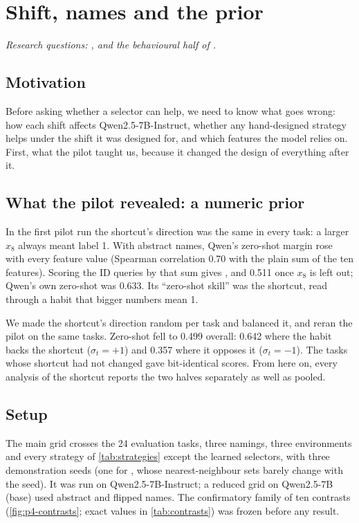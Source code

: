 \chapter{Shift, names and the prior}
\label{ch:shift}

\emph{Research questions: ,  and the behavioural half of .}

\section{Motivation}

Before asking whether a selector can help, we need to know what goes wrong: how each shift affects Qwen2.5-7B-Instruct, whether any hand-designed strategy helps under the shift it was designed for, and which features the model relies on. First, what the pilot taught us, because it changed the design of everything after it.

\section{What the pilot revealed: a numeric prior}
\label{sec:shift-p2}

In the first pilot run the shortcut's direction was the same in every task: a larger $x_8$ always meant label 1.
With abstract names, Qwen's zero-shot margin rose with every feature value (Spearman correlation 0.70 with the plain sum of the ten features).
Scoring the ID queries by that sum gives , and 0.511 once $x_8$ is left out; Qwen's own zero-shot \AUROC was 0.633.
Its ``zero-shot skill'' was the shortcut, read through a habit that bigger numbers mean 1.


We made the shortcut's direction random per task and balanced it, and reran the pilot on the same tasks.
Zero-shot \AUROC fell to 0.499 overall: 0.642 where the habit backs the shortcut ($\sigma_t = +1$) and 0.357 where it opposes it ($\sigma_t = -1$).
The tasks whose shortcut had not changed gave bit-identical scores.
From here on, every analysis of the shortcut reports the two halves separately as well as pooled.

\section{Setup}

The main grid crosses the 24 evaluation tasks, three namings, three environments and every strategy of \autoref{tab:strategies} except the learned selectors, with three demonstration seeds (one for , whose nearest-neighbour sets barely change with the seed).
It was run on Qwen2.5-7B-Instruct; a reduced grid on Qwen2.5-7B (base) used abstract and flipped names.
The confirmatory family of ten contrasts (\autoref{fig:p4-contrasts}; exact values in \autoref{tab:contrasts}) was frozen before any result.

